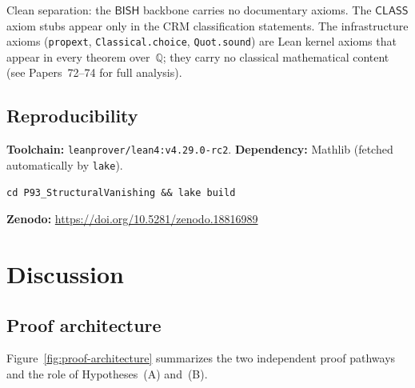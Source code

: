 \documentclass[11pt]{article}
\theoremstyle{plain}
\theoremstyle{definition}
\theoremstyle{remark}
\newcommand{\QQ}{\mathbb{Q}}
\newcommand{\BISH}{\mathsf{BISH}}
\newcommand{\CLASS}{\mathsf{CLASS}}
\begin{document}
Clean separation: the $\BISH$ backbone carries no documentary axioms.
The $\CLASS$ axiom stubs appear only in the CRM classification statements.
The infrastructure axioms (\texttt{propext}, \texttt{Classical.choice},
\texttt{Quot.sound}) are Lean kernel axioms that appear in every theorem
over~$\QQ$; they carry no classical mathematical content (see Papers~72--74
for full analysis).

\subsection{Reproducibility}

\textbf{Toolchain:} \texttt{leanprover/lean4:v4.29.0-rc2}.
\textbf{Dependency:} Mathlib (fetched automatically by \texttt{lake}).

\begin{verbatim}
cd P93_StructuralVanishing && lake build
\end{verbatim}

\noindent
\textbf{Zenodo:} \url{https://doi.org/10.5281/zenodo.18816989}

\section{Discussion}\label{sec:discussion}

\subsection{Proof architecture}

Figure~\ref{fig:proof-architecture} summarizes the two independent proof
pathways and the role of Hypotheses~(A) and~(B).
\end{document}
